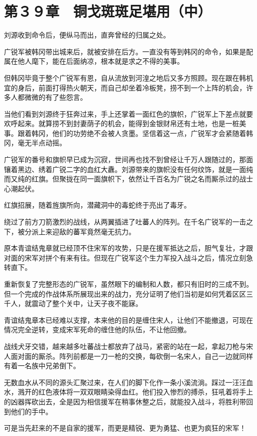 \section{第３９章　铜戈斑斑足堪用（中）}

刘源收到命令后，便纵马而出，直奔曾经的归属之处。

广锐军被韩冈带出城来后，就被安排在后方。一直没有等到韩冈的命令，如果是配属在他人麾下，能在后面纳凉，根本就是求之不得的美事。

但韩冈毕竟于整个广锐军有恩，自从流放到河湟之地后又多方照顾。现在跟在韩机宜的身后，前面打得热火朝天，而自己却坐着冷板凳，捞不到一个上阵的机会，许多人都微微的有了些怨言。

当他们看到刘源终于狂奔过来，手上还掌着一面红色的旗帜，广锐军上下差点就要欢呼起来。就算捞不到封妻荫子的机会，能得到金银财帛还有土地，也是一桩美事。跟着韩冈，他们的功劳绝不会被人贪墨。坚信着这一点，广锐军才会紧随着韩冈，毫无半点动摇。

广锐军的番号和旗帜早已成为沉寂，世间再也找不到曾经让千万人跟随过的，那面镶着黑边、绣着广锐二字的血红大纛。刘源带来的旗帜没有任何纹饰，就是一面纯而又纯的红旗。但聚拢在同一面旗帜下，依然让千百名为广锐之名而厮杀过的战士心潮起伏。

红旗招展，随着旌旗所向，潜藏洞中的毒蛇终于亮出了毒牙。

绕过了前方刀箭激烈的战线，从两翼插进了吐蕃人的阵列。在千名广锐军的一击之下，被分派上来迎敌的蕃军竟然毫无抗力。

原本青谊结鬼章就已经顶不住宋军的攻势，只是在援军抵达之后，胆气复壮，才跟对面的宋军对拼个有来有往。但现在广锐军这个生力军投入战斗之后，情况立刻急转直下。

重新恢复了完整形态的广锐军，虽然眼下的编制和人数，都只有旧时的三成不到。但一个完成的作战体系所展现出来的战力，充分证明了他们当初是如何凭着区区三千人，就震动了整个关中，让天子夜不能寐。

青谊结鬼章本已经难以支撑，本来他的目的是缠住宋人，让他们不能撤退，可现在情况完全逆转，变成宋军死命的缠住他的队伍，不让他回撤。

战线犬牙交错，越来越多吐蕃战士都放弃了战马，紧密的站在一起，拿起刀枪与宋人面对面的厮杀。阵列前都是一刀一枪的交换，每砍倒一名宋人，自己一边就同样有着一名族中兄弟倒下。

无数血水从不同的源头汇聚过来，在人们的脚下化作一条小溪流淌。踩过一汪汪血水，溅开的红色液体将一双双眼睛染得血红。他们投入惨烈的搏杀，狂吼着将手上的凶器挥砍出去，全是因为相信援军在稍事休整之后，就能投入战斗，将胜利带回到他们的手中。

可是当先赶来的不是自家的援军，而更是精锐、更为勇猛、也更为疯狂的宋军！

